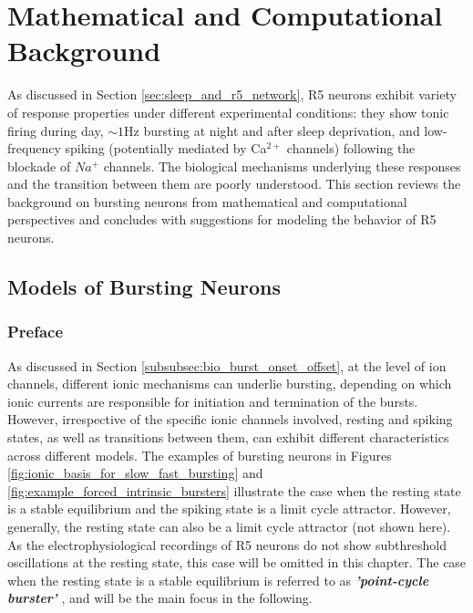 \documentclass[../main.tex]{subfiles}
\begin{document}

\section{Mathematical and Computational Background} \label{sec:math_background}

As discussed in Section \ref{sec:sleep_and_r5_network}, R5 neurons exhibit variety of response properties under different experimental conditions: they show tonic firing during day, $\sim1$Hz bursting at night and after sleep deprivation, and low-frequency spiking (potentially mediated by Ca$^{2+}$ channels) following the blockade of $Na^+$ channels. The biological mechanisms underlying these responses and the transition between them are poorly understood. This section reviews the background on bursting neurons from mathematical and computational perspectives and concludes with suggestions for modeling the behavior of R5 neurons.

\subsection{Models of Bursting Neurons}

\subsubsection{Preface} \label{subsubsec:bursting_models_preface}

As discussed in Section \ref{subsubsec:bio_burst_onset_offset}, at the level of ion channels, different ionic mechanisms can underlie bursting, depending on which ionic currents are responsible for initiation and termination of the bursts.
However, irrespective of the specific ionic channels involved, resting and spiking states, as well as transitions between them, can exhibit different characteristics across different models. The examples of bursting neurons in Figures \ref{fig:ionic_basis_for_slow_fast_bursting}
and \ref{fig:example_forced_intrinsic_bursters} illustrate the case when the resting
state is a stable equilibrium and the spiking state is a limit cycle attractor. However,
generally, the resting state can also be a limit cycle attractor (not shown here).
As the electrophysiological recordings of R5 neurons do not show subthreshold oscillations
at the resting state, this case will be omitted in this chapter. The case when the resting state
is a stable equilibrium is referred to as \textbf{\textit{'point-cycle burster'}}
\parencite{izhikevichNEURALEXCITABILITYSPIKING2000}, and will be the main focus in the following.
\end{document}
